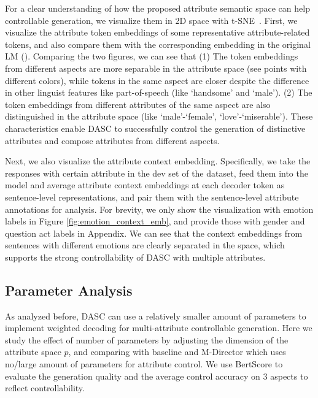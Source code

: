 For a clear understanding of how the proposed attribute semantic space can 
help controllable generation, we visualize them in 2D space with 
t-SNE~\citep{van2008visualizing}. First, we visualize the attribute token 
embeddings of some representative attribute-related tokens, and also compare 
them with the corresponding embedding in the original LM (). Comparing the two figures, we can see that (1) The token embeddings from different 
aspects are more separable in the attribute space 
(see points with different colors), while tokens in the same aspect
are closer despite the difference in other linguist features like 
part-of-speech (like `handsome' and `male'). 
(2) The token embeddings from different attributes of the same aspect
are also distinguished in the attribute space (like `male'-`female', `love'-`miserable'). These characteristics enable DASC to successfully control the generation of distinctive attributes and compose attributes from different aspects.


Next, we also visualize the attribute context embedding. Specifically, we take the responses with certain attribute in the dev set of the dataset, feed them into the model and average attribute context embeddings at each decoder token as sentence-level representations, and pair them with the sentence-level attribute annotations for analysis. For brevity, we only show the visualization with emotion labels in Figure \ref{fig:emotion_context_emb}, and provide those with gender and question act labels in Appendix. We can see that the context embeddings from sentences with different emotions are clearly separated in the space, which supports the strong controllability of DASC with multiple attributes.

\subsection{Parameter Analysis}
\label{sec:parameter_analysis}
As analyzed before, DASC can use a relatively smaller amount 
of parameters to implement weighted decoding for multi-attribute controllable 
generation. Here we study the effect of number of parameters by adjusting the 
dimension of the attribute space $p$, and comparing with baseline and 
M-Director which uses no/large amount of parameters for attribute control. We use BertScore to evaluate the generation quality and 
the average control accuracy on 3 aspects to reflect controllability.

